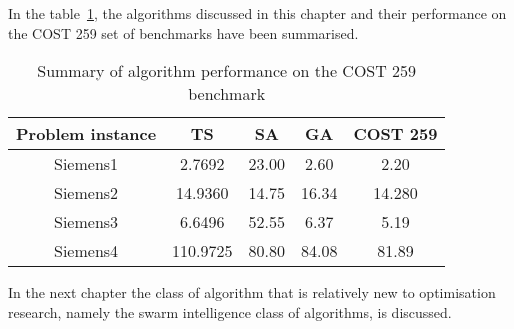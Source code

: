 In the table~\ref{tab:summary1}, the algorithms discussed in this chapter and their performance on the \gls{COST} 259 set of benchmarks have been summarised.
\begin{table}[H]
\label{tbl:summaryMetaTable}
\begin{center}
	\begin{tabular}{| c | c | c | c | c |}
	\hline
	Problem instance & \gls{TS} & \gls{SA} & \gls{GA} & \gls{COST} 259 \\ \hline
	Siemens1 & 2.7692 & 23.00 & 2.60 & 2.20 \\ \hline
	Siemens2 & 14.9360 & 14.75 & 16.34 & 14.280 \\ \hline
	Siemens3 & 6.6496 & 52.55 & 6.37 & 5.19 \\ \hline
	Siemens4 & 110.9725 & 80.80 & 84.08 & 81.89 \\ \hline
	\end{tabular}
\caption{Summary of algorithm performance on the \gls{COST} 259 benchmark}
\label{tab:summary1}
\end{center}
\end{table}

In the next chapter the class of algorithm that is relatively new to optimisation research, namely the swarm intelligence class of algorithms, is discussed.
